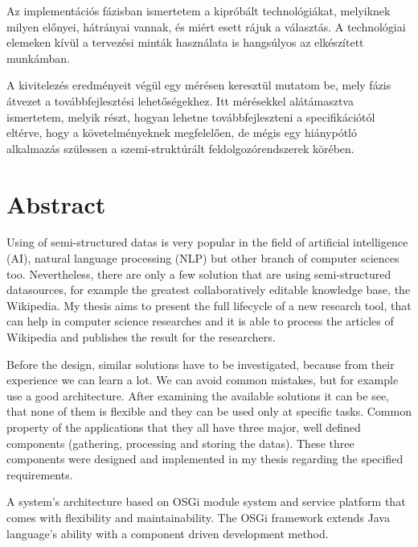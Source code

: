 Az implementációs fázisban ismertetem a kipróbált technológiákat, melyiknek milyen előnyei, hátrányai vannak, és miért esett rájuk a választás. A technológiai elemeken kívül a tervezési minták használata is hangsúlyos az elkészített munkámban.

A kivitelezés eredményeit végül egy mérésen keresztül mutatom be, mely fázis átvezet a továbbfejlesztési lehetőségekhez. Itt mérésekkel alátámasztva ismertetem, melyik részt, hogyan lehetne továbbfejleszteni a specifikációtól eltérve, hogy a követelményeknek megfelelően, de mégis egy hiánypótló alkalmazás szülessen a szemi-struktúrált feldolgozórendszerek körében.

\vfill

\chapter*{Abstract}

Using of semi-structured datas is very popular in the field of artificial intelligence (AI), natural language processing (NLP) but other branch of computer sciences too. Nevertheless, there are only a few solution that are using semi-structured datasources, for example the greatest collaboratively editable knowledge base, the Wikipedia. My thesis aims to present the full lifecycle of a new research tool, that can help in computer science researches and it is able to process the articles of Wikipedia and publishes the result for the researchers.

Before the design, similar solutions have to be investigated, because from their experience we can learn a lot. We can avoid common mistakes, but for example use a good architecture. After examining the available solutions it can be see, that none of them is flexible and they can be used only at specific tasks. Common property of the applications that they all have three major, well defined components (gathering, processing and storing the datas). These three components were designed and implemented in my thesis regarding the specified requirements.

A system's architecture based on OSGi module system and service platform that comes with flexibility and maintainability. The OSGi framework extends Java language's ability with a component driven development method.

